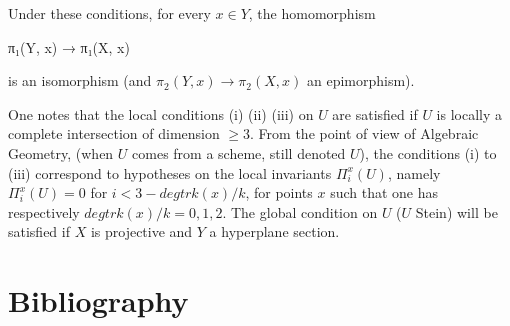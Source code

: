\documentclass[
  11pt,
  a4paper,
]{book}
\newenvironment{Shaded}{}{}
\newcommand{\NormalTok}[1]{#1}
\begin{document}
Under these conditions, for every \(x \in Y\), the homomorphism

\begin{Shaded}
\begin{Highlighting}[]
\NormalTok{π₁(Y, x) → π₁(X, x)}
\end{Highlighting}
\end{Shaded}

is an isomorphism (and \(\pi_{2}(Y, x) \to \pi_{2}(X, x)\) an
epimorphism).

One notes that the local conditions (i) (ii) (iii) on \(U\) are
satisfied if \(U\) is locally a complete intersection of dimension
\(\geqslant 3\). From the point of view of Algebraic Geometry, (when
\(U\) comes from a scheme, still denoted \(U\)), the conditions (i) to
(iii) correspond to hypotheses on the local invariants
\(\Pi^{x}_{i}(U)\), namely \(\Pi^{x}_{i}(U) = 0\) for
\(i < 3 - deg tr k(x)/k\), for points \(x\) such that one has
respectively \(deg tr k(x)/k = 0, 1,
2\). The global condition on \(U\) (\(U\) Stein) will be satisfied if
\(X\) is projective and \(Y\) a hyperplane section.

\section{Bibliography}\label{bibliography-3}
\end{document}
